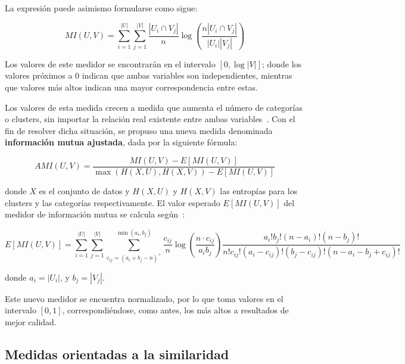 La expresión puede asimismo formularse como sigue:

\begin{equation}
    \label{eq:mutual-information-cardinality}
    MI(U,V) = \sum_{i=1}^{|U|}\sum_{j=1}^{|V|}{\frac{|U_i \cap V_j|}{n}\log{\left( \frac{n|U_i \cap V_j|}{|U_i||V_j|} \right)}}
\end{equation}

Los valores de este medidor se encontrarán en el intervalo $[0,\log{|V|}]$;
donde los valores próximos a 0 indican que ambas variables son independientes, mientras que valores más altos indican una mayor correspondencia entre estas.

Los valores de esta medida crecen a medida que aumenta el número de categorías o clusters, sin importar la relación real existente entre ambas variables~\cite{Vinh10}.
Con el fin de resolver dicha situación, se propuso una nueva medida denominada \textbf{información mutua ajustada}, dada por la siguiente fórmula:

\begin{equation}
    \label{eq:adjusted-mutual-information}
    AMI(U,V) = \frac{MI(U,V) - E[MI(U,V)]}{\max{(H(X, U), H(X, V)) - E[MI(U,V)]}}
\end{equation}

\noindent
donde $X$ es el conjunto de datos y $H(X,U)$ y $H(X,V)$ las entropías para los clusters y las categorías respectivamente.
El valor esperado $E[MI(U,V)]$ del medidor de información mutua se calcula según~\cite{Vinh10}:

{\footnotesize
\begin{equation*}
    \label{eq:expected-value-mutual-information}
    E[MI(U,V)] = \sum_{i=1}^{|U|}\sum_{j=1}^{|V|}\sum_{c_{ij}=(a_i+b_j-n)^{+}}^{\min{(a_i,b_j)}}
    {
    \frac{c_{ij}}{n}
    \log{\left( \frac{n \cdot c_{ij}}{a_i b_j} \right)}
    \frac{a_i ! b_j ! (n-a_i)!(n-b_j)!}{n!c_{ij}!(a_i-c_{ij})!(b_j-c_{ij})!(n-a_i-b_j+c_{ij})!}
    }
\end{equation*}
}

\noindent
donde $a_i = |U_i|$, y $b_j = |V_j|$.

Este nuevo medidor se encuentra normalizado, por lo que toma valores en el intervalo $[0, 1]$, correspondiéndose, como antes, los más altos a resultados de mejor calidad.

\subsection{Medidas orientadas a la similaridad}\label{subsec:medidasOrientadasALaSimilaridad}

